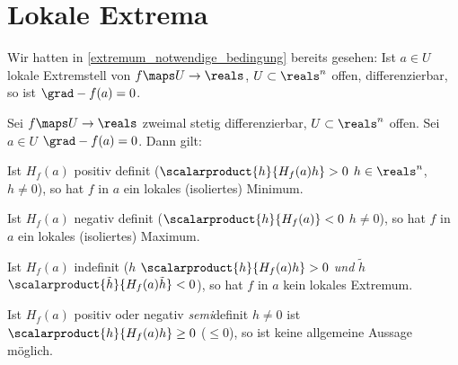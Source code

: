 \section*{Lokale Extrema}
Wir hatten in \ref{extremum_notwendige_bedingung} bereits gesehen: Ist \( a\in U \) lokale Extremstell von \( f\maps U\to \reals \), \( U\subset \reals^n \) offen, differenzierbar, so ist \( \grad-{f}(a)=0 \).
\begin{satz}\label{hinreichende_bedingung_isoliertes_extremum}
  Sei \( f\maps U\to \reals \) zweimal stetig differenzierbar, \( U\subset \reals^n \) offen. Sei \( a\in U \) \sd \( \grad-{f}(a)=0 \). Dann gilt:
  \begin{eigenschaftenenumerate}
    \item\label{hinreichende_bedingung_isoliertes_minimum} Ist \( H_f(a) \) positiv definit (\dh \( \scalarproduct{h}{H_f(a)h}>0 \) \tforall \( h\in \reals^n \), \( h\neq 0 \)), so hat \( f \) in \( a \) ein lokales (isoliertes) Minimum.
    \item\label{hinreichende_bedingung_isoliertes_maximum} Ist \( H_f(a) \) negativ definit (\dh \( \scalarproduct{h}{H_f(a)}<0 \) \tforall \( h\neq 0 \)), so hat \( f \) in \( a \) ein lokales (isoliertes) Maximum.
    \item\label{hinreichende_bedingung_kein_extremum} Ist \( H_f(a) \) indefinit (\dh \texists  \( h \) \sd \( \scalarproduct{h}{H_f(a)h}>0 \) \emph{und} \texists \( \tilde{h} \) \sd \( \scalarproduct{\tilde{h}}{H_f(a)\tilde{h}}<0 \)), so hat \( f \) in \( a \) kein lokales Extremum.
  \end{eigenschaftenenumerate}
\end{satz}
\begin{bemerkung*}
  Ist \( H_f(a) \) positiv oder negativ \emph{semi}definit \sd \tforall \( h\neq 0 \) ist \( \scalarproduct{h}{H_f(a)h}\geq 0 \) (\bzw \( \leq 0 \)), so ist keine allgemeine Aussage möglich.
\end{bemerkung*}
